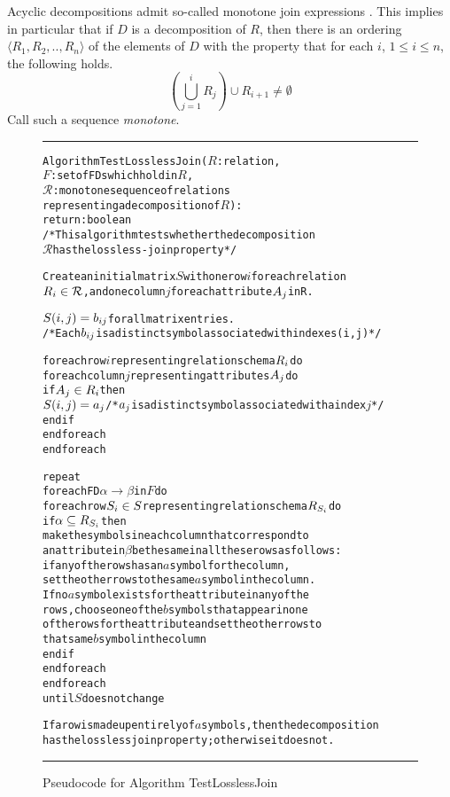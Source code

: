 Acyclic decompositions admit so-called monotone join expressions
\cite[Theorem 3.4]{BeeriFMY83}. This implies in particular that if
$D$ is a decomposition of $R$, then there is an ordering
 $\langle R_1,R_2,..,R_n \rangle$
of the elements of $D$ with the property that for each $i$,
 $1{}\leq{}i{}\leq{}n$, the following holds.
 \[
   \left( \bigcup_{j=1}^{i} R_j \right) \cup R_{i+1} \neq \emptyset
 \]
 Call such a sequence \emph{monotone}.


\begin{figure}[htbp]
\hrule
\vspace{0.25cm}
\begin{alltt}
Algorithm TestLosslessJoin(\(R\): relation,
              \(F\): set of FDs which hold in \(R\),
              \(\mathcal{R}\): monotone sequence of relations 
                  representing a decomposition of \(R\)):
        return: boolean
/* This algorithm tests whether the decomposition 
\(\mathcal{R}\) has the lossless-join property */
  
  Create an initial matrix \(S\) with one row \(i\) for each relation 
  \(R\sb{i} \in \mathcal{R}\), and one column \(j\) for each attribute \(A\sb{j}\) in R.  
  
   
  \(S(i, j) = b\sb{ij}\) for all matrix entries. 
  /* Each \(b\sb{ij}\) is a distinct symbol associated with indexes (i,j)*/
  
  foreach row \(i\) representing relation schema \(R\sb{i}\) do
    foreach column \(j\) representing attributes \(A\sb{j}\) do
      if \(A\sb{j} \in R\sb{i}\) then
        \(S(i, j) = a\sb{j}\) /* \(a\sb{j}\) is a distinct symbol associated with a index \(j\) */
      end if
    end foreach
  end foreach
  
  repeat
    foreach FD \(\alpha \rightarrow \beta\) in \(F\) do
      foreach row \(S\sb{i} \in S\) representing relation schema \(R\sb{S\sb{i}}\) do
        if \(\alpha \subseteq R\sb{S\sb{i}}\) then
          make the symbols in each column that correspond to
          an attribute in \(\beta\) be the same in all these rows as follows:
          if any of the rows has an \(a\) symbol for the column,
          set the other rows to the same \(a\) symbol in the column.
          If no \(a\) symbol exists for the attribute in any of the
          rows, choose one of the \(b\) symbols that appear in one
          of the rows for the attribute and set the other rows to
          that same \(b\) symbol in the column
        end if
      end foreach
    end foreach
  until \(S\) does not change
                  
If a row is made up entirely of \(a\) symbols, then the decomposition 
has the lossless join property; otherwise it does not.
\end{alltt}
\caption{Pseudocode for Algorithm TestLosslessJoin}\label{alg:lossless}
\hrule
\end{figure}

